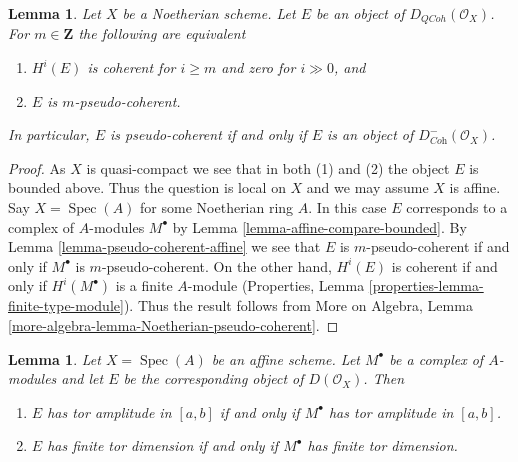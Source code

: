 \documentclass{stacks-project}
\theoremstyle{plain}
\newtheorem{lemma}[subsection]{Lemma}
\theoremstyle{definition}
\theoremstyle{remark}
\numberwithin{equation}{subsection}
\def\Spec{\mathop{\mathrm{Spec}}}
\def\QCoh{\mathit{QCoh}}
\begin{document}
\begin{lemma}
\label{lemma-identify-pseudo-coherent-noetherian}
Let $X$ be a Noetherian scheme. Let $E$ be an object of
$D_\QCoh(\mathcal{O}_X)$. For $m \in \mathbf{Z}$ the
following are equivalent
\begin{enumerate}
\item $H^i(E)$ is coherent for $i \geq m$ and zero for $i \gg 0$, and
\item $E$ is $m$-pseudo-coherent.
\end{enumerate}
In particular, $E$ is pseudo-coherent if and only if $E$ is an object
of $D^-_{\textit{Coh}}(\mathcal{O}_X)$.
\end{lemma}

\begin{proof}
As $X$ is quasi-compact we see that in both (1) and (2) the object $E$
is bounded above. Thus the question is local on $X$ and we may assume
$X$ is affine. Say $X = \Spec(A)$ for some Noetherian ring $A$.
In this case $E$ corresponds to a complex of $A$-modules $M^\bullet$
by Lemma \ref{lemma-affine-compare-bounded}. By
Lemma \ref{lemma-pseudo-coherent-affine}
we see that $E$ is $m$-pseudo-coherent if and only if $M^\bullet$
is $m$-pseudo-coherent. On the other hand, $H^i(E)$ is coherent
if and only if $H^i(M^\bullet)$ is a finite $A$-module
(Properties, Lemma \ref{properties-lemma-finite-type-module}).
Thus the result follows from More on Algebra, Lemma
\ref{more-algebra-lemma-Noetherian-pseudo-coherent}.
\end{proof}

\begin{lemma}
\label{lemma-tor-dimension-affine}
Let $X = \Spec(A)$ be an affine scheme. Let $M^\bullet$ be a
complex of $A$-modules and let $E$ be the corresponding object
of $D(\mathcal{O}_X)$. Then
\begin{enumerate}
\item $E$ has tor amplitude in $[a, b]$ if and only if $M^\bullet$
has tor amplitude in $[a, b]$.
\item $E$ has finite tor dimension if and only if $M^\bullet$
has finite tor dimension.
\end{enumerate}
\end{lemma}
\end{document}

